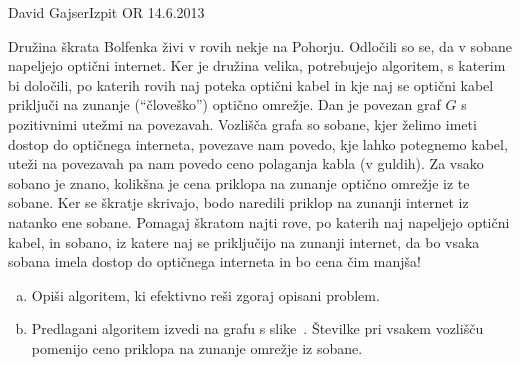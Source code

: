 \begin{naloga}{David Gajser}{Izpit OR 14.6.2013}
\begin{vprasanje}
Družina škrata Bolfenka živi v rovih nekje na Pohorju.
Odločili so se, da v sobane napeljejo optični internet.
Ker je družina velika, potrebujejo algoritem, s katerim bi določili,
po katerih rovih naj poteka optični kabel
in kje naj se optični kabel priključi
na zunanje (``človeško'') optično omrežje.
Dan je povezan graf $G$ s pozitivnimi utežmi na povezavah.
Vozlišča grafa so sobane, kjer želimo imeti dostop do optičnega interneta,
povezave nam povedo, kje lahko potegnemo kabel,
uteži na povezavah pa nam povedo ceno polaganja kabla (v guldih).
Za vsako sobano je znano,
kolikšna je cena priklopa na zunanje optično omrežje iz te sobane.
Ker se škratje skrivajo,
bodo naredili priklop na zunanji internet iz natanko ene sobane.
Pomagaj škratom najti rove, po katerih naj napeljejo optični kabel,
in sobano, iz katere naj se priključijo na zunanji internet,
da bo vsaka sobana imela dostop do optičnega interneta in bo cena čim manjša!

\begin{enumerate}[(a)]
\item Opiši algoritem, ki efektivno reši zgoraj opisani problem.

\item Predlagani algoritem izvedi na grafu s slike~\fig{}.
Številke pri vsakem vozlišču
pomenijo ceno priklopa na zunanje omrežje iz sobane.
\end{enumerate}

\begin{slika}
\pgfslika
{}
\end{slika}
\end{vprasanje}
\begin{odgovor}
\end{odgovor}
\end{naloga}
